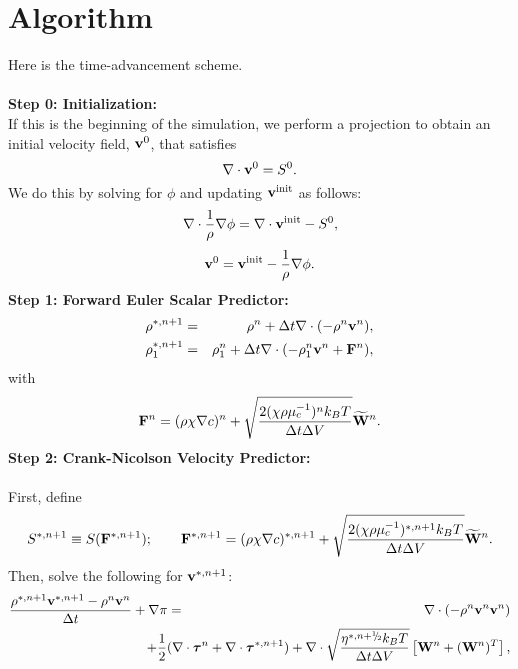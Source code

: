 \documentclass[final]{siamltex}
\newcommand{\sfrac}[2]{\mathchoice
  {\kern0em\raise.5ex\hbox{\the\scriptfont0 #1}\kern-.15em/
   \kern-.15em\lower.25ex\hbox{\the\scriptfont0 #2}}
  {\kern0em\raise.5ex\hbox{\the\scriptfont0 #1}\kern-.15em/
   \kern-.15em\lower.25ex\hbox{\the\scriptfont0 #2}}
  {\kern0em\raise.5ex\hbox{\the\scriptscriptfont0 #1}\kern-.2em/
   \kern-.15em\lower.25ex\hbox{\the\scriptscriptfont0 #2}}
  {#1\!/#2}}
\def\Fb {{\bf F}}
\def\vb {{\bf v}}
\def\Wb {{\bf W}}
\def\taub {\boldsymbol{\tau}}
\def\half   {\frac{1}{2}}
\def\myhalf {\sfrac{1}{2}}
\begin{document}
\section{Algorithm}
Here is the time-advancement scheme.\\ \\
{\bf Step 0: Initialization:}\\

If this is the beginning of the simulation, we perform a projection to obtain an initial 
velocity field, $\vb^0$, that satisfies
\begin{equation}
\nabla\cdot\vb^0 = S^0.
\end{equation}
We do this by solving for $\phi$ and updating $\vb^{\rm init}$ as follows:
\begin{equation}
\nabla\cdot\frac{1}{\rho}\nabla\phi = \nabla\cdot\vb^{\rm init} - S^0,
\end{equation}
\begin{equation}
\vb^0 = \vb^{\rm init} - \frac{1}{\rho}\nabla\phi.
\end{equation}
{\bf Step 1: Forward Euler Scalar Predictor:}
\begin{eqnarray}
\rho^{*,n+1} &=& \rho^n + \Delta t\nabla\cdot(-\rho^n\vb^n),\\
\rho_1^{*,n+1} &=& \rho_1^n + \Delta t\nabla\cdot(-\rho_1^n\vb^n + \Fb^n),
\end{eqnarray}
with
\begin{equation}
\Fb^n = (\rho\chi\nabla c)^n + \sqrt{\frac{2(\chi\rho\mu_c^{-1})^nk_BT}{\Delta t\Delta V}}\widetilde\Wb^n.
\end{equation}
{\bf Step 2: Crank-Nicolson Velocity Predictor:}\\ \\
First, define
\begin{equation}
S^{*,n+1} \equiv S(\Fb^{*,n+1});
\qquad
\Fb^{*,n+1} = (\rho\chi\nabla c)^{*,n+1} + \sqrt{\frac{2(\chi\rho\mu_c^{-1})^{*,n+1}k_BT}{\Delta t\Delta V}}\widetilde\Wb^n.
\end{equation}
Then, solve the following for $\vb^{*,n+1}$:
\begin{eqnarray}
\frac{\rho^{*,n+1}\vb^{*,n+1} - \rho^n\vb^n}{\Delta t} + \nabla\pi &=& \nabla\cdot(-\rho^n\vb^n\vb^n)\nonumber\\
&&\hspace{-0.5in}+ \half(\nabla\cdot\taub^n + \nabla\cdot\taub^{*,n+1}) + \nabla\cdot\sqrt{\frac{\eta^{*,n+\myhalf} k_B T}{\Delta t\Delta V}}\left[\Wb^n + (\Wb^n)^T\right],\label{eq:CN Vel Pred}
\end{eqnarray}
\end{document}

